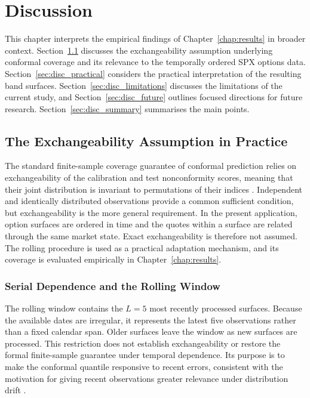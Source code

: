 \chapter{Discussion}
\label{chap:discussion}

This chapter interprets the empirical findings of Chapter~\ref{chap:results} in broader context. Section~\ref{sec:disc_exchangeability} discusses the exchangeability assumption underlying conformal coverage and its relevance to the temporally ordered SPX options data. Section~\ref{sec:disc_practical} considers the practical interpretation of the resulting band surfaces. Section~\ref{sec:disc_limitations} discusses the limitations of the current study, and Section~\ref{sec:disc_future} outlines focused directions for future research. Section~\ref{sec:disc_summary} summarises the main points.

\section{The Exchangeability Assumption in Practice}
\label{sec:disc_exchangeability}

The standard finite-sample coverage guarantee of conformal prediction relies on exchangeability of the calibration and test nonconformity scores, meaning that their joint distribution is invariant to permutations of their indices \cite{shafer2008tutorial,angelopoulos2023gentle}. Independent and identically distributed observations provide a common sufficient condition, but exchangeability is the more general requirement. In the present application, option surfaces are ordered in time and the quotes within a surface are related through the same market state. Exact exchangeability is therefore not assumed. The rolling procedure is used as a practical adaptation mechanism, and its coverage is evaluated empirically in Chapter~\ref{chap:results}.

\subsection{Serial Dependence and the Rolling Window}
\label{subsec:disc_serial}

The rolling window contains the $L=5$ most recently processed surfaces. Because the available dates are irregular, it represents the latest five observations rather than a fixed calendar span. Older surfaces leave the window as new surfaces are processed. This restriction does not establish exchangeability or restore the formal finite-sample guarantee under temporal dependence. Its purpose is to make the conformal quantile responsive to recent errors, consistent with the motivation for giving recent observations greater relevance under distribution drift \cite{barber2023conformal}.

